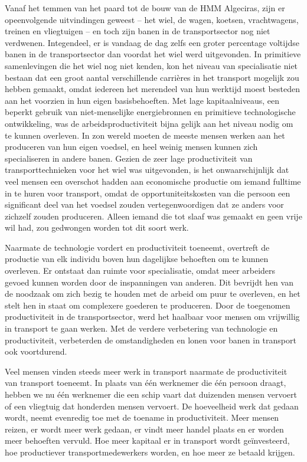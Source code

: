 Vanaf het temmen van het paard tot de bouw van de HMM Algeciras, zijn er opeenvolgende uitvindingen geweest -- het wiel, de wagen, koetsen, vrachtwagens, treinen en vliegtuigen -- en toch zijn banen in de transportsector nog niet verdwenen. Integendeel, er is vandaag de dag zelfs een groter percentage voltijdse banen in de transportsector dan voordat het wiel werd uitgevonden. In primitieve samenlevingen die het wiel nog niet kenden, kon het niveau van specialisatie niet bestaan dat een groot aantal verschillende carrières in het transport mogelijk zou hebben gemaakt, omdat iedereen het merendeel van hun werktijd moest besteden aan het voorzien in hun eigen basisbehoeften. Met lage kapitaalniveaus, een beperkt gebruik van niet-menselijke energiebronnen en primitieve technologische ontwikkeling, was de arbeidsproductiviteit bijna gelijk aan het niveau nodig om te kunnen overleven. In zo\textquotesingle n wereld moeten de meeste mensen werken aan het produceren van hun eigen voedsel, en heel weinig mensen kunnen zich specialiseren in andere banen. Gezien de zeer lage productiviteit van transporttechnieken voor het wiel was uitgevonden, is het onwaarschijnlijk dat veel mensen een overschot hadden aan economische productie om iemand fulltime in te huren voor transport, omdat de opportuniteitskosten van die persoon een significant deel van het voedsel zouden vertegenwoordigen dat ze anders voor zichzelf zouden produceren. Alleen iemand die tot slaaf was gemaakt en geen vrije wil had, zou gedwongen worden tot dit soort werk.

Naarmate de technologie vordert en productiviteit toeneemt, overtreft de productie van elk individu boven hun dagelijkse behoeften om te kunnen overleven. Er ontstaat dan ruimte voor specialisatie, omdat meer arbeiders gevoed kunnen worden door de inspanningen van anderen. Dit bevrijdt hen van de noodzaak om zich bezig te houden met de arbeid om puur te overleven, en het stelt hen in staat om complexere goederen te produceren. Door de toegenomen productiviteit in de transportsector, werd het haalbaar voor mensen om vrijwillig in transport te gaan werken. Met de verdere verbetering van technologie en productiviteit, verbeterden de omstandigheden en lonen voor banen in transport ook voortdurend.

Veel mensen vinden steeds meer werk in transport naarmate de productiviteit van transport toeneemt. In plaats van één werknemer die één persoon draagt, hebben we nu één werknemer die een schip vaart dat duizenden mensen vervoert of een vliegtuig dat honderden mensen vervoert. De hoeveelheid werk dat gedaan wordt, neemt evenredig toe met de toename in productiviteit. Meer mensen reizen, er wordt meer werk gedaan, er vindt meer handel plaats en er worden meer behoeften vervuld. Hoe meer kapitaal er in transport wordt geïnvesteerd, hoe productiever transportmedewerkers worden, en hoe meer ze betaald krijgen.

